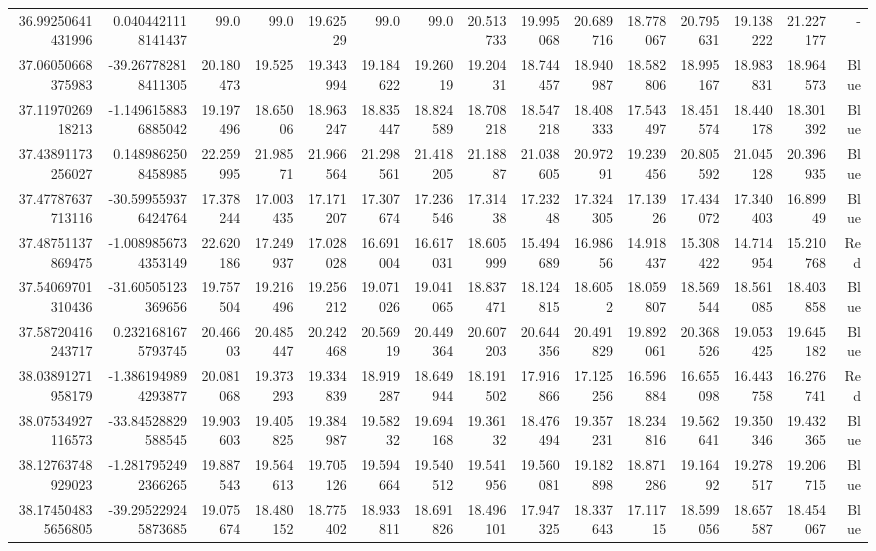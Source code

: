 \begin{center}
\begin{longtable}{rrrrrrrrrrrrrrr}
36.99250641431996 & 0.0404421118141437 & 99.0 & 99.0 & 19.62529 & 99.0 & 99.0 & 20.513733 & 19.995068 & 20.689716 & 18.778067 & 20.795631 & 19.138222 & 21.227177 & - \\
37.06050668375983 & -39.267782818411305 & 20.180473 & 19.525 & 19.343994 & 19.184622 & 19.26019 & 19.20431 & 18.744457 & 18.940987 & 18.582806 & 18.995167 & 18.983831 & 18.964573 & Blue \\
37.1197026918213 & -1.1496158836885042 & 19.197496 & 18.65006 & 18.963247 & 18.835447 & 18.824589 & 18.708218 & 18.547218 & 18.408333 & 17.543497 & 18.451574 & 18.440178 & 18.301392 & Blue \\
37.43891173256027 & 0.1489862508458985 & 22.259995 & 21.98571 & 21.966564 & 21.298561 & 21.418205 & 21.18887 & 21.038605 & 20.97291 & 19.239456 & 20.805592 & 21.045128 & 20.396935 & Blue \\
37.47787637713116 & -30.599559376424764 & 17.378244 & 17.003435 & 17.171207 & 17.307674 & 17.236546 & 17.31438 & 17.23248 & 17.324305 & 17.13926 & 17.434072 & 17.340403 & 16.89949 & Blue \\
37.48751137869475 & -1.0089856734353149 & 22.620186 & 17.249937 & 17.028028 & 16.691004 & 16.617031 & 18.605999 & 15.494689 & 16.98656 & 14.918437 & 15.308422 & 14.714954 & 15.210768 & Red \\
37.54069701310436 & -31.60505123369656 & 19.757504 & 19.216496 & 19.256212 & 19.071026 & 19.041065 & 18.837471 & 18.124815 & 18.6052 & 18.059807 & 18.569544 & 18.561085 & 18.403858 & Blue \\
37.58720416243717 & 0.2321681675793745 & 20.46603 & 20.485447 & 20.242468 & 20.56919 & 20.449364 & 20.607203 & 20.644356 & 20.491829 & 19.892061 & 20.368526 & 19.053425 & 19.645182 & Blue \\
38.03891271958179 & -1.3861949894293877 & 20.081068 & 19.373293 & 19.334839 & 18.919287 & 18.649944 & 18.191502 & 17.916866 & 17.125256 & 16.596884 & 16.655098 & 16.443758 & 16.276741 & Red \\
38.07534927116573 & -33.84528829588545 & 19.903603 & 19.405825 & 19.384987 & 19.58232 & 19.694168 & 19.36132 & 18.476494 & 19.357231 & 18.234816 & 19.562641 & 19.350346 & 19.432365 & Blue \\
38.12763748929023 & -1.2817952492366265 & 19.887543 & 19.564613 & 19.705126 & 19.594664 & 19.540512 & 19.541956 & 19.560081 & 19.182898 & 18.871286 & 19.16492 & 19.278517 & 19.206715 & Blue \\
38.174504835656805 & -39.295229245873685 & 19.075674 & 18.480152 & 18.775402 & 18.933811 & 18.691826 & 18.496101 & 17.947325 & 18.337643 & 17.11715 & 18.599056 & 18.657587 & 18.454067 & Blue \\

\end{longtable}
\end{center}

